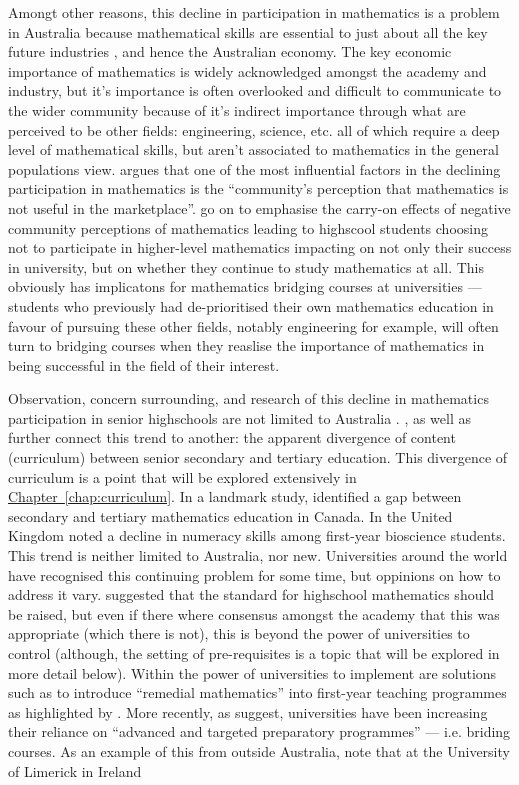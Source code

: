 \documentclass[twoside,12pt,a4paper]{report}
\newcommand{\refchap}[1]{\hyperref[chap:#1]{Chapter~\ref{chap:#1}}}
\begin{document}
Amongt other reasons, this decline in participation in mathematics is a problem in Australia because mathematical skills are essential to just about all the key future industries \cite{Croft2009}, and hence the Australian economy. The key economic importance of mathematics is widely acknowledged amongst the academy and industry, but it's importance is often overlooked and difficult to communicate to the wider community because of it's indirect importance through what are perceived to be other fields: engineering, science, etc. all of which require a deep level of mathematical skills, but aren't associated to mathematics in the general populations view.  argues that one of the most influential factors in the declining participation in mathematics is the ``community’s perception that mathematics is not useful in the marketplace''.  go on to  emphasise the carry-on effects of negative community perceptions of mathematics leading to highscool students choosing not to participate in higher-level mathematics impacting on not only their success in university, but on whether they continue to study mathematics at all. This obviously has implicatons for mathematics bridging courses at universities --- students who previously had de-prioritised their own mathematics education in favour of pursuing these other fields, notably engineering for example, will often turn to bridging courses when they reaslise the importance of mathematics in being successful in the field of their interest.

Observation, concern surrounding, and research of this decline in mathematics participation in senior highschools are not limited to Australia \cite{Hourigan2007, Hoyles2001}. ,  as well as  further connect this trend to another: the apparent divergence of content (curriculum) between senior secondary and tertiary education. This divergence of curriculum is a point that will be explored extensively in \refchap{curriculum}. In a landmark study,  identified a gap between secondary and tertiary mathematics education in Canada. In the United Kingdom  noted a decline in numeracy skills among first-year bioscience students. This trend is neither limited to Australia, nor new. Universities around the world have recognised this continuing problem for some time, but oppinions on how to address it vary.  suggested that the standard for highschool mathematics should be raised, but even if there where consensus amongst the academy that this was appropriate (which there is not), this is beyond the power of universities to control (although, the setting of pre-requisites is a topic that will be explored in more detail below). Within the power of universities to implement are solutions such as to introduce ``remedial mathematics'' into first-year teaching programmes as highlighted by . More recently, as  suggest, universities have been increasing their reliance on ``advanced and targeted preparatory programmes'' --- i.e. briding courses. As an example of this from outside Australia,  note that at the University of Limerick in Ireland 
\end{document}
